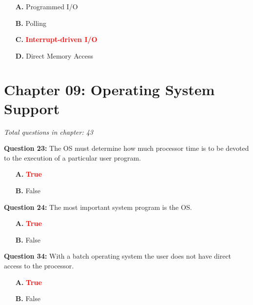\documentclass[12pt,a4paper]{article}
\begin{document}
\begin{itemize}
    \item[\textbf{A.}] Programmed I/O
    \item[\textbf{B.}] Polling
    \item[\textbf{C.}] \textcolor{red}{\textbf{Interrupt-driven I/O}}
    \item[\textbf{D.}] Direct Memory Access
\end{itemize}

\section{Chapter 09: Operating System Support}
\textit{Total questions in chapter: 43}

\textbf{Question 23:} The OS must determine how much processor time is to be devoted to the execution of a particular user program.

\begin{itemize}
    \item[\textbf{A.}] \textcolor{red}{\textbf{True}}
    \item[\textbf{B.}] False
\end{itemize}

\vspace{0.5cm}

\vspace{0.5cm}

\textbf{Question 24:} The most important system program is the OS.

\begin{itemize}
    \item[\textbf{A.}] \textcolor{red}{\textbf{True}}
    \item[\textbf{B.}] False
\end{itemize}

\vspace{0.5cm}

\vspace{0.5cm}

\textbf{Question 34:} With a batch operating system the user does not have direct access to the processor.

\begin{itemize}
    \item[\textbf{A.}] \textcolor{red}{\textbf{True}}
    \item[\textbf{B.}] False
\end{itemize}

\vspace{0.5cm}
\end{document}
